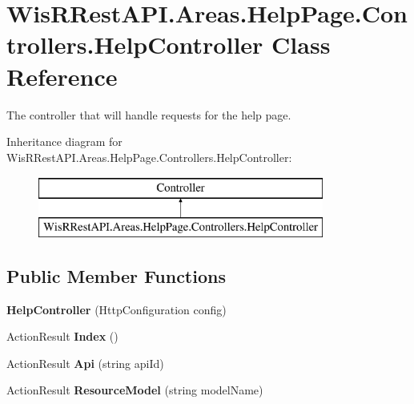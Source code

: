 \hypertarget{class_wis_r_rest_a_p_i_1_1_areas_1_1_help_page_1_1_controllers_1_1_help_controller}{}\section{Wis\+R\+Rest\+A\+P\+I.\+Areas.\+Help\+Page.\+Controllers.\+Help\+Controller Class Reference}
\label{class_wis_r_rest_a_p_i_1_1_areas_1_1_help_page_1_1_controllers_1_1_help_controller}


The controller that will handle requests for the help page.  


Inheritance diagram for Wis\+R\+Rest\+A\+P\+I.\+Areas.\+Help\+Page.\+Controllers.\+Help\+Controller\+:\begin{figure}[H]
\begin{center}
\leavevmode
\includegraphics[height=2.000000cm]{class_wis_r_rest_a_p_i_1_1_areas_1_1_help_page_1_1_controllers_1_1_help_controller}
\end{center}
\end{figure}
\subsection*{Public Member Functions}
\begin{DoxyCompactItemize}
\item 
\hypertarget{class_wis_r_rest_a_p_i_1_1_areas_1_1_help_page_1_1_controllers_1_1_help_controller_ab5ea1477b7b440e4c14a7c310e5a4039}{}{\bfseries Help\+Controller} (Http\+Configuration config)\label{class_wis_r_rest_a_p_i_1_1_areas_1_1_help_page_1_1_controllers_1_1_help_controller_ab5ea1477b7b440e4c14a7c310e5a4039}

\item 
\hypertarget{class_wis_r_rest_a_p_i_1_1_areas_1_1_help_page_1_1_controllers_1_1_help_controller_a6be83d0a4c5e806e73cd914212e4a781}{}Action\+Result {\bfseries Index} ()\label{class_wis_r_rest_a_p_i_1_1_areas_1_1_help_page_1_1_controllers_1_1_help_controller_a6be83d0a4c5e806e73cd914212e4a781}

\item 
\hypertarget{class_wis_r_rest_a_p_i_1_1_areas_1_1_help_page_1_1_controllers_1_1_help_controller_a3ab4f31e01a925730f041010af93d72a}{}Action\+Result {\bfseries Api} (string api\+Id)\label{class_wis_r_rest_a_p_i_1_1_areas_1_1_help_page_1_1_controllers_1_1_help_controller_a3ab4f31e01a925730f041010af93d72a}

\item 
\hypertarget{class_wis_r_rest_a_p_i_1_1_areas_1_1_help_page_1_1_controllers_1_1_help_controller_a7408e0806ef43f7873b86f7d267fe817}{}Action\+Result {\bfseries Resource\+Model} (string model\+Name)\label{class_wis_r_rest_a_p_i_1_1_areas_1_1_help_page_1_1_controllers_1_1_help_controller_a7408e0806ef43f7873b86f7d267fe817}

\end{DoxyCompactItemize}
